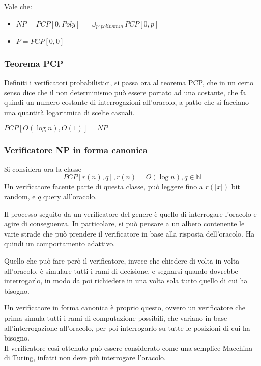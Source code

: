 \begin{remark}
    Vale che:
    \begin{itemize}
        \item $NP = PCP[0,\mathit{Poly}] = \cup_{p : \mathit{polinomio}}PCP[0, p]$ 
        \item $P = PCP[0,0]$
    \end{itemize}
\end{remark}

\subsubsection{Teorema PCP}
Definiti i verificatori probabilistici, si passa ora al teorema PCP, 
che in un certo senso dice che il non determinismo può essere portato ad una costante, 
che fa quindi un numero costante di interrogazioni all'oracolo, 
a patto che si facciano una quantità logaritmica di scelte casuali.

\begin{theorem}
    $PCP[O(\log n), O(1)] = NP$
\end{theorem}

\subsubsection{Verificatore NP in forma canonica}
Si considera ora la classe 
$$PCP[r(n), q], r(n) = O(\log n), q \in \mathbb{N}$$
Un verificatore facente parte di questa classe, può leggere 
fino a $r(|x|)$ bit random, e $q$ query all'oracolo.

Il processo seguito da un verificatore del genere è quello 
di interrogare l'oracolo e agire di conseguenza.
In particolare, si può pensare a un albero contenente le varie strade che può prendere 
il verificatore in base alla risposta dell'oracolo. Ha quindi un comportamento 
adattivo.

Quello che può fare però il verificatore, invece che chiedere di volta in volta 
all'oracolo, è simulare tutti i rami di decisione, e segnarsi quando dovrebbe 
interrogarlo, in modo da poi richiedere in una volta sola tutto quello di 
cui ha bisogno.

Un verificatore in forma canonica è proprio questo, ovvero un verificatore che prima
simula tutti i rami di computazione possibili, che variano in base all'interrogazione
all'oracolo, per poi interrogarlo su tutte le posizioni di cui ha bisogno.\\
Il verificatore così ottenuto può essere considerato come una semplice Macchina di Turing, 
infatti non deve più interrogare l'oracolo.

